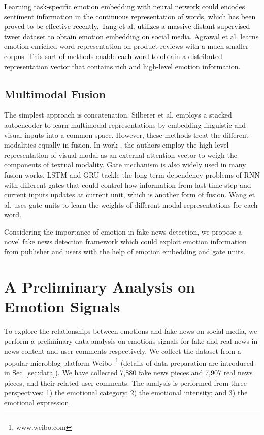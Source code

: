 \documentclass[conference]{IEEEtran}
\newcommand{\new}[1]{\textcolor{black}{{#1}}}
\begin{document}
	\new{Learning task-specific emotion embedding with neural network could encodes sentiment information in the continuous representation of words, which has been proved to be effective recently. Tang et al.\cite{Tang14} utilizes a massive distant-supervised tweet dataset to obtain emotion embedding on social media.} Agrawal et al.\cite{agrawal2018learning} learns emotion-enriched word-representation on product reviews with a much smaller corpus. \new{This sort of methods enable each word to obtain a distributed representation vector that contains rich and high-level emotion information. }
	
	\subsection{Multimodal Fusion}
	The simplest approach is concatenation. Silberer et al.\cite{silberer2017visually} employs a stacked autoencoder to learn multimodal representations by embedding linguistic and visual inputs into a common space. However, these methods treat the different modalities equally in fusion. In work \cite{jin2017multimodal}, the authors employ the high-level representation of visual modal as an external attention vector to weigh the components of textual modality. Gate mechanism is also widely used in many fusion works. LSTM \cite{hochreiter1997long} and GRU \cite{bahdanau2014neural} tackle the long-term dependency problems of RNN with different gates that could control how information from last time step and current inputs updates at current unit, which is another form of fusion. Wang et al.\cite{wang2018learning} uses gate units to learn the weights of different modal representations for each word. 
	
	Considering the importance of emotion in fake news detection, we propose a novel fake news detection framework which could exploit emotion information from publisher and users with the help of emotion embedding and gate units.
	
	
	\section{A Preliminary Analysis on Emotion Signals }\label{sec:analysis}
	To explore the relationships between emotions and fake news on social media, we perform a preliminary data analysis on emotions signals for fake and real news in news content and user comments respectively. We collect the dataset from a popular microblog platform Weibo~\footnote{www.weibo.com} (details of data preparation are introduced in Sec~\ref{sec:data}). We have collected 7,880 fake news pieces and 7,907 real news pieces, and their related user comments. The analysis is performed from three perspectives: 1) the emotional category; 2) the emotional intensity; and 3) the emotional expression.
	
\end{document}
